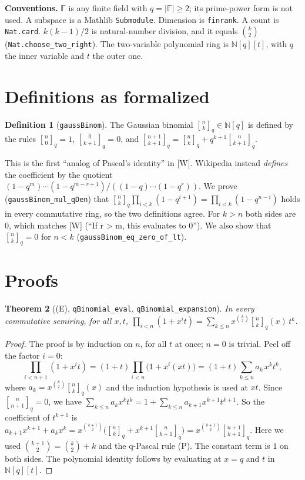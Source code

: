 \documentclass[11pt]{article}
\newtheorem{theorem}{Theorem}
\theoremstyle{definition}
\newtheorem{definition}[theorem]{Definition}
\newcommand{\qb}[2]{\genfrac{[}{]}{0pt}{}{#1}{#2}_{q}}
\newcommand{\F}{\mathbb{F}}
\begin{document}
\textbf{Conventions.} $\F$ is any finite field with $q=|\F|\ge 2$; its prime-power form is not
used. A subspace is a Mathlib \texttt{Submodule}. Dimension is \texttt{finrank}. A count is
\texttt{Nat.card}. $k(k-1)/2$ is natural-number division, and it equals $\binom{k}{2}$
(\texttt{Nat.choose\_two\_right}). The two-variable polynomial ring is $\mathbb{N}[q][t]$, with
$q$ the inner variable and $t$ the outer one.

\section{Definitions as formalized}

\begin{definition}[\texttt{gaussBinom}]
The Gaussian binomial $\qb{n}{k}\in\mathbb{N}[q]$ is defined by the rules $\qb{n}{0}=1$,
$\qb{0}{k+1}=0$, and $\qb{n+1}{k+1}=\qb{n}{k}+q^{k+1}\qb{n}{k+1}$.
\end{definition}

This is the first ``analog of Pascal's identity'' in [W]. Wikipedia instead \emph{defines} the
coefficient by the quotient $(1-q^m)\cdots(1-q^{m-r+1})/((1-q)\cdots(1-q^r))$. We prove
(\texttt{gaussBinom\_mul\_qDen}) that
$\qb nk\prod_{i<k}(1-q^{i+1})=\prod_{i<k}(1-q^{n-i})$ holds in every commutative ring, so the
two definitions agree. For $k>n$ both sides are $0$, which matches [W] (``If r > m, this
evaluates to 0''). We also show that $\qb nk=0$ for $n<k$ (\texttt{gaussBinom\_eq\_zero\_of\_lt}).

\section{Proofs}

\begin{theorem}[(E), \texttt{qBinomial\_eval}, \texttt{qBinomial\_expansion}]
In every commutative semiring, for all $x,t$,
$\prod_{i<n}(1+x^it)=\sum_{k\le n}x^{\binom k2}\qb nk(x)\,t^k$.
\end{theorem}
\begin{proof}
The proof is by induction on $n$, for all $t$ at once; $n=0$ is trivial. Peel off the factor
$i=0$:
\[\prod_{i<n+1}(1+x^it)=(1+t)\prod_{i<n}\bigl(1+x^i(xt)\bigr)=(1+t)\sum_{k\le n}a_k\,x^kt^k,\]
where $a_k=x^{\binom k2}\qb nk(x)$ and the induction hypothesis is used at $xt$. Since
$\qb{n}{n+1}=0$, we have $\sum_{k\le n}a_kx^kt^k=1+\sum_{k\le n}a_{k+1}x^{k+1}t^{k+1}$. So the
coefficient of $t^{k+1}$ is
$a_{k+1}x^{k+1}+a_kx^k=x^{\binom{k+1}2}\bigl(\qb nk+x^{k+1}\qb n{k+1}\bigr)=x^{\binom{k+1}2}\qb{n+1}{k+1}$.
Here we used $\binom{k+1}2=\binom k2+k$ and the q-Pascal rule (P). The constant term is $1$ on
both sides. The polynomial identity follows by evaluating at $x=q$ and $t$ in
$\mathbb{N}[q][t]$.
\end{proof}
\end{document}
